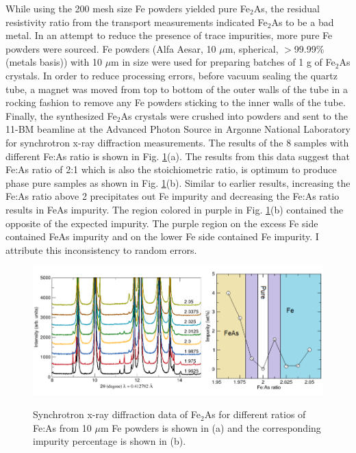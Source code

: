 \documentclass[10pt,doublespacing,edeposit]{uiucthesis2020}
\begin{document}
\begin{mainmatter}
While using the 200 mesh size Fe powders yielded pure Fe$_2$As, the residual resistivity ratio from the transport measurements indicated Fe$_2$As to be a bad metal. In an attempt to reduce the presence of trace impurities, more pure Fe powders were sourced. Fe powders (Alfa Aesar, 10 $\mu$m, spherical, $>$99.99\% (metals basis)) with 10 $\mu$m in size were used for preparing batches of 1 g of Fe$_2$As crystals. In order to reduce processing errors, before vacuum sealing the quartz tube, a magnet was moved from top to bottom of the outer walls of the tube in a rocking fashion to remove any Fe powders sticking to the inner walls of the tube. Finally, the synthesized Fe$_2$As crystals were crushed into powders and sent to the 11-BM beamline at the Advanced Photon Source in Argonne National Laboratory for synchrotron x-ray diffraction measurements. The results of the 8 samples with different Fe:As ratio is shown in Fig. \ref{fig:Fe2As_ratio_2}(a). The results from this data suggest that Fe:As ratio of 2:1 which is also the stoichiometric ratio, is optimum to produce phase pure samples as shown in Fig. \ref{fig:Fe2As_ratio_2}(b). Similar to earlier results, increasing the Fe:As ratio above 2 precipitates out Fe impurity and decreasing the Fe:As ratio results in FeAs impurity. The region colored in purple in Fig. \ref{fig:Fe2As_ratio_2}(b) contained the opposite of the expected impurity. The purple region on the excess Fe side contained FeAs impurity and on the lower Fe side contained Fe impurity. I attribute this inconsistency to random errors.

\begin{figure}
\centering\includegraphics[width=\columnwidth]{figures/ch3/Fe2As_stoichiometry.png} \\
\caption{\label{fig:Fe2As_ratio_2}
Synchrotron x-ray diffraction data of Fe$_2$As for different ratios of Fe:As from 10 $\mu$m Fe powders is shown in (a) and the corresponding impurity percentage is shown in (b).
}
\end{figure}


\end{mainmatter}
\end{document}
